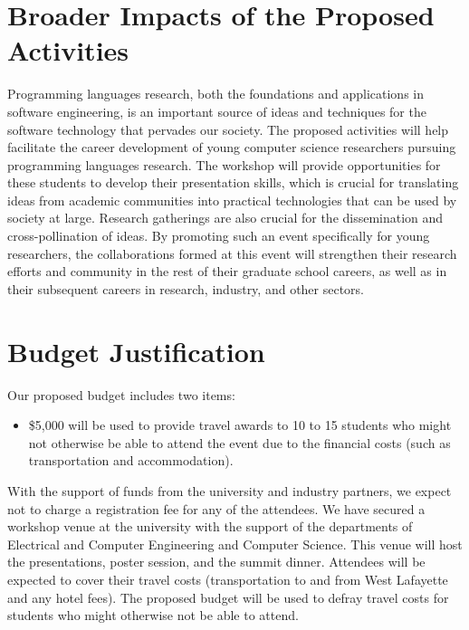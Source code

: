 \documentclass[11pt]{article}
\begin{document}
\section{Broader Impacts of the Proposed Activities}

Programming languages research, both the foundations and applications
in software engineering, is an important source of ideas and
techniques for the software technology that pervades our society.
The proposed activities will help facilitate the career development of
young computer science researchers pursuing programming languages
research. The workshop will provide opportunities for these students
to develop their presentation skills, which is crucial for translating
ideas from academic communities into practical technologies that can
be used by society at large. Research gatherings are also crucial for
the dissemination and cross-pollination of ideas. By promoting such an
event specifically for young researchers, the collaborations formed at
this event will strengthen their research efforts and community in the
rest of their graduate school careers, as well as in their subsequent
careers in research, industry, and other sectors.







\newpage

\setcounter{page}{1}


\section*{Budget Justification}

Our proposed budget includes two items:

\begin{itemize}

\item \$5,000 will be used to provide travel awards to 10 to 15 students who
might not otherwise be able to attend the event due to the financial
costs (such as transportation and accommodation).

\end{itemize}

\noindent
With the support of funds from the university and industry partners, we expect not to charge a
registration fee for any of the attendees. We have secured
a workshop venue at the university with the support of the departments of Electrical and Computer Engineering and Computer Science. This venue will host the presentations, poster session, and the summit dinner. Attendees
will be expected to cover their travel costs (transportation to and
from West Lafayette and any hotel fees). The proposed budget will be used to defray travel costs for students who might otherwise not be able to attend.
\end{document}
